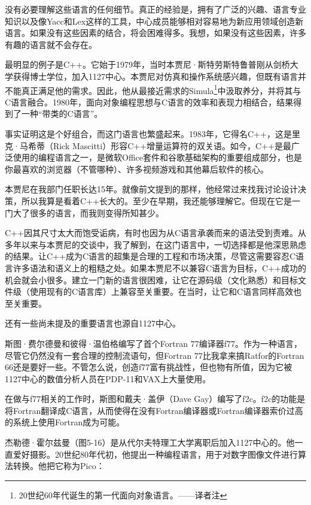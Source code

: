 \documentclass[a4paper,12pt,UTF8,twoside]{ctexbook}
\begin{document}
没有必要理解这些语言的任何细节。真正的经验是，拥有了广泛的兴趣、语言专业知识以及像Yacc和Lex这样的工具，中心成员能够相对容易地为新应用领域创造新语言。如果没有这些因素的结合，将会困难得多。我想，如果没有这些因素，许多有趣的语言就不会存在。

最明显的例子是C++。它始于1979年，当时本贾尼·斯特劳斯特鲁普刚从剑桥大学获得博士学位，加入1127中心。本贾尼对仿真和操作系统感兴趣，但既有语言并不能真正满足他的需求。因此，他从最接近需求的Simula\footnote{20世纪60年代诞生的第一代面向对象语言。——译者注}中汲取养分，并将其与C语言融合。1980年，面向对象编程思想与C语言的效率和表现力相结合，结果得到了一种“带类的C语言”。

事实证明这是个好组合，而这门语言也繁盛起来。1983年，它得名C++，这是里克·马希蒂（Rick Mascitti）形容C++增量运算符的双关语。如今，C++是最广泛使用的编程语言之一，是微软Office套件和谷歌基础架构的重要组成部分，也是你最喜欢的浏览器（不管哪种）、许多视频游戏和其他幕后软件的核心。

本贾尼在我部门任职长达15年。就像前文提到的那样，他经常过来找我讨论设计决策，所以我算是看着C++长大的。至少在早期，我还能够理解它。但现在它是一门大了很多的语言，而我则变得所知甚少。

C++因其尺寸太大而饱受诟病，有时也因为从C语言承袭而来的语法受到责难。从多年以来与本贾尼的交谈中，我了解到，在这门语言中，一切选择都是他深思熟虑的结果。让C++成为C语言的超集是合理的工程和市场决策，尽管这需要容忍C语言许多语法和语义上的粗糙之处。如果本贾尼不以兼容C语言为目标，C++成功的机会就会小很多。建立一门新的语言很困难，让它在源码级（文化熟悉）和目标文件级（使用现有的C语言库）上兼容至关重要。在当时，让它和C语言同样高效也至关重要。

还有一些尚未提及的重要语言也源自1127中心。

斯图·费尔德曼和彼得·温伯格编写了首个Fortran 77编译器f77。作为一种语言，尽管它仍然没有一套合理的控制流语句，但Fortran 77比我拿来搞Ratfor的Fortran 66还是要好一些。不管怎么说，创造f77富有挑战性，但也物有所值，因为它被1127中心的数值分析人员在PDP-11和VAX上大量使用。

在做与f77相关的工作时，斯图和戴夫·盖伊（Dave Gay）编写了f2c。f2c的功能是将Fortran翻译成C语言，从而使得在没有Fortran编译器或Fortran编译器索价过高的系统上使用Fortran成为可能。

杰勒德·霍尔兹曼（图5-16）是从代尔夫特理工大学离职后加入1127中心的。他一直爱好摄影。20世纪80年代初，他提出一种编程语言，用于对数字图像文件进行算法转换。他把它称为Pico：
\end{document}

